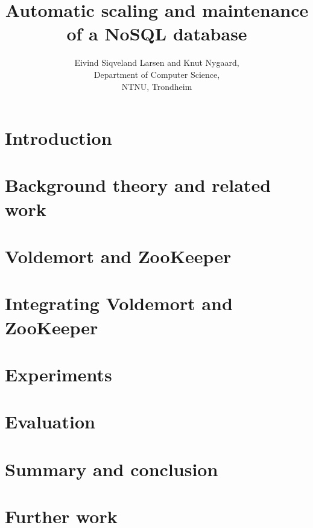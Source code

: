 \documentclass[a4paper, 12pt]{report}
\title{Automatic scaling and maintenance of a NoSQL database}
\author{Eivind Siqveland Larsen and Knut Nygaard,\\
        Department of Computer Science,\\
        NTNU,
        Trondheim}
\begin{document}
\maketitle
\thispagestyle{empty}

\clearpage


\clearpage


\clearpage


\clearpage

\tableofcontents
\clearpage


\listoffigures
\clearpage
\setcounter{page}{1}

\chapter{Introduction}
\label{chapter:introduction}


\clearpage


\clearpage

\chapter{Background theory and related work}
\label{chapter:background}

\clearpage


\clearpage


\clearpage



\chapter{Voldemort and ZooKeeper}
\label{chapter:voldemort_and_zookeeper}


\clearpage


\clearpage

\chapter{Integrating Voldemort and ZooKeeper}
\label{chapter:implementation}

\clearpage

\chapter{Experiments}
\label{chapter:results}



\chapter{Evaluation}
\label{chapter:evaluation}


\chapter{Summary and conclusion}
\label{chapter:summary}


\chapter{Further work}
\label{chapter:futurework}




\end{document}

